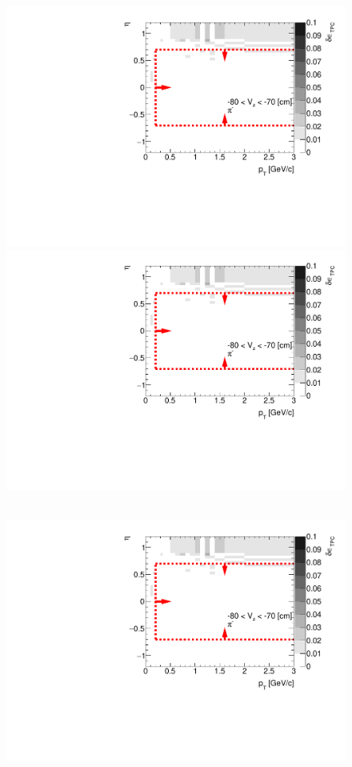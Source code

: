 \begin{figure}[hb]
{  \includegraphics[width=\linewidth,page=5]{graphics/systematicsEfficiency/deadMaterial/secondaries_Unbinned_SDCD_.pdf}\\
  \includegraphics[width=\linewidth,page=7]{graphics/systematicsEfficiency/deadMaterial/secondaries_Unbinned_SDCD_.pdf}\\
}~
\parbox{0.495\textwidth}{
  \centering
  \includegraphics[width=\linewidth,page=2]{graphics/systematicsEfficiency/deadMaterial/secondaries_Unbinned_SDCD_.pdf}\\
}
\end{figure}
